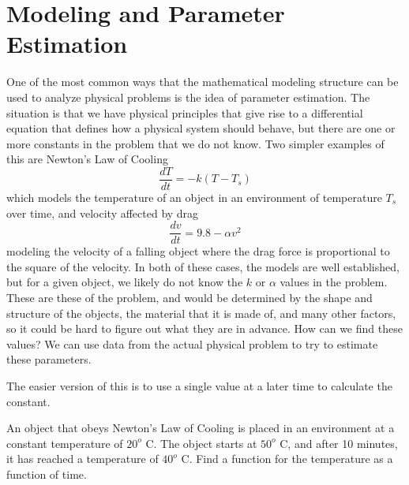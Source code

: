 \section{Modeling and Parameter Estimation}
\label{modelfirstestim:section}


One of the most common ways that the mathematical modeling structure can be used to analyze physical problems is the idea of parameter estimation. The situation is that we have physical principles that give rise to a differential equation that defines how a physical system should behave, but there are one or more constants in the problem that we do not know. Two simpler examples of this are Newton's Law of Cooling 
\begin{equation*}
\frac{dT}{dt} = -k(T - T_s)
\end{equation*}
which models the temperature of an object in an environment of temperature $T_s$ over time, and velocity affected by drag
\begin{equation*}
\frac{dv}{dt} = 9.8 - \alpha v^2
\end{equation*}
modeling the velocity of a falling object where the drag force is proportional to the square of the velocity. In both of these cases, the models are well established, but for a given object, we likely do not know the $k$ or $\alpha$ values in the problem. These are these \emph{} of the problem, and would be determined by the shape and structure of the objects, the material that it is made of, and many other factors, so it could be hard to figure out what they are in advance. How can we find these values? We can use data from the actual physical problem to try to estimate these parameters.

The easier version of this is to use a single value at a later time to calculate the constant.

\begin{example} 
An object that obeys Newton's Law of Cooling is placed in an environment at a constant temperature of $20^o$ C. The object starts at $50^o$ C, and after 10 minutes, it has reached a temperature of $40^o$ C. Find a function for the temperature as a function of time.
\end{example}

